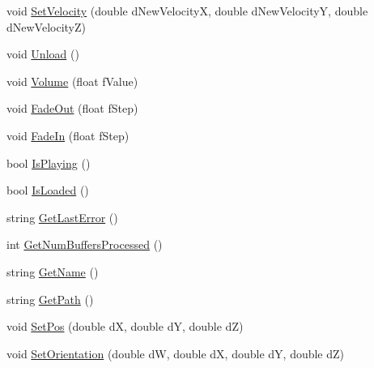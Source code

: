 \begin{DoxyCompactItemize}
void \hyperlink{classs13_sound_afa526e39aac3118a3c313635015316a4}{Set\-Velocity} (double d\-New\-Velocity\-X, double d\-New\-Velocity\-Y, double d\-New\-Velocity\-Z)
\item 
void \hyperlink{classs13_sound_a2608c3621c16047763aaaed39b13c0c7}{Unload} ()
\item 
void \hyperlink{classs13_sound_a077a91d4a741b0a17dff3e4526e26610}{Volume} (float f\-Value)
\item 
void \hyperlink{classs13_sound_a03d25622f12411a9df6c258d14128eed}{Fade\-Out} (float f\-Step)
\item 
void \hyperlink{classs13_sound_a5af4c779cd51ad267f908a3311db39e6}{Fade\-In} (float f\-Step)
\item 
bool \hyperlink{classs13_sound_a14fb1d588e10a1ed91098faa48c97341}{Is\-Playing} ()
\item 
bool \hyperlink{classs13_sound_a2367af1c5c4b4dc268b2da6001582d07}{Is\-Loaded} ()
\item 
string \hyperlink{classs13_sound_a4ea229c7ed2efb2da87b83fdcbf24975}{Get\-Last\-Error} ()
\item 
int \hyperlink{classs13_sound_a25a36ecefbcb6acad87211d501858abb}{Get\-Num\-Buffers\-Processed} ()
\item 
string \hyperlink{classs13_sound_a02b425bb109988d888c796311f9ee29a}{Get\-Name} ()
\item 
string \hyperlink{classs13_sound_acb1164a573433832bc7d99053d122b07}{Get\-Path} ()
\item 
void \hyperlink{classs13_sound_af251df489a2846dcd6bc16dcbd320e74}{Set\-Pos} (double d\-X, double d\-Y, double d\-Z)
\item 
void \hyperlink{classs13_sound_a18ae85eac4146be60b25b57c187bfc1b}{Set\-Orientation} (double d\-W, double d\-X, double d\-Y, double d\-Z)
\end{DoxyCompactItemize}
